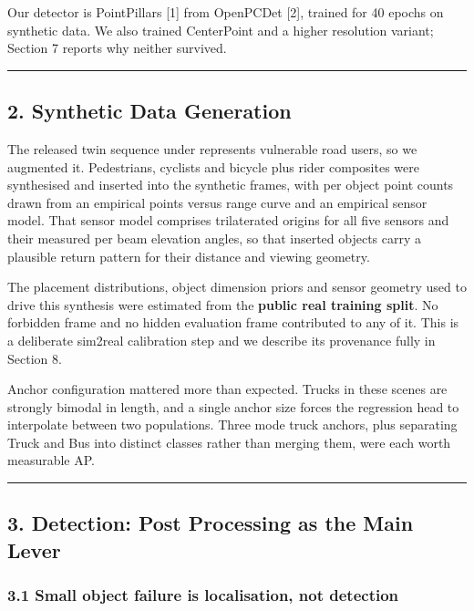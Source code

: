 \documentclass[
  10pt,
]{article}
\begin{document}
Our detector is PointPillars {[}1{]} from OpenPCDet {[}2{]}, trained for
40 epochs on synthetic data. We also trained CenterPoint and a higher
resolution variant; Section 7 reports why neither survived.

\begin{center}\rule{0.5\linewidth}{0.5pt}\end{center}

\subsection{2. Synthetic Data
Generation}\label{synthetic-data-generation}

The released twin sequence under represents vulnerable road users, so we
augmented it. Pedestrians, cyclists and bicycle plus rider composites
were synthesised and inserted into the synthetic frames, with per object
point counts drawn from an empirical points versus range curve and an
empirical sensor model. That sensor model comprises trilaterated origins
for all five sensors and their measured per beam elevation angles, so
that inserted objects carry a plausible return pattern for their
distance and viewing geometry.

The placement distributions, object dimension priors and sensor geometry
used to drive this synthesis were estimated from the \textbf{public real
training split}. No forbidden frame and no hidden evaluation frame
contributed to any of it. This is a deliberate sim2real calibration step
and we describe its provenance fully in Section 8.

Anchor configuration mattered more than expected. Trucks in these scenes
are strongly bimodal in length, and a single anchor size forces the
regression head to interpolate between two populations. Three mode truck
anchors, plus separating Truck and Bus into distinct classes rather than
merging them, were each worth measurable AP.

\begin{center}\rule{0.5\linewidth}{0.5pt}\end{center}

\subsection{3. Detection: Post Processing as the Main
Lever}\label{detection-post-processing-as-the-main-lever}

\subsubsection{3.1 Small object failure is localisation, not
detection}\label{small-object-failure-is-localisation-not-detection}
\end{document}
